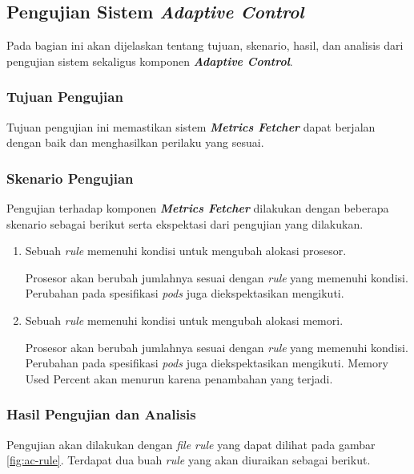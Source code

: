 \subsection{Pengujian Sistem \textit{Adaptive Control}}

Pada bagian ini akan dijelaskan tentang tujuan, skenario, hasil, dan analisis dari pengujian sistem sekaligus komponen \textbf{\textit{Adaptive Control}}.

\subsubsection{Tujuan Pengujian}

Tujuan pengujian ini memastikan sistem \textbf{\textit{Metrics Fetcher}} dapat berjalan dengan baik dan menghasilkan perilaku yang sesuai.

\subsubsection{Skenario Pengujian}

Pengujian terhadap komponen \textbf{\textit{Metrics Fetcher}} dilakukan dengan beberapa skenario sebagai berikut serta ekspektasi dari pengujian yang dilakukan.
\begin{enumerate}
    \item Sebuah \textit{rule} memenuhi kondisi untuk mengubah alokasi prosesor.
    
    Prosesor akan berubah jumlahnya sesuai dengan \textit{rule} yang memenuhi kondisi. Perubahan pada spesifikasi \textit{pods} juga diekspektasikan mengikuti.

    \item Sebuah \textit{rule} memenuhi kondisi untuk mengubah alokasi memori.
    
    Prosesor akan berubah jumlahnya sesuai dengan \textit{rule} yang memenuhi kondisi. Perubahan pada spesifikasi \textit{pods} juga diekspektasikan mengikuti. Memory Used Percent akan menurun karena penambahan yang terjadi.
\end{enumerate}

\subsubsection{Hasil Pengujian dan Analisis}

Pengujian akan dilakukan dengan \textit{file rule} yang dapat dilihat pada gambar \ref{fig:ac-rule}. Terdapat dua buah \textit{rule} yang akan diuraikan sebagai berikut.

